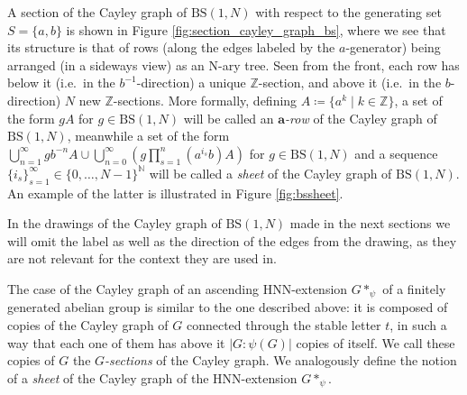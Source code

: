 \documentclass[letterpaper,11pt,reqno]{amsart}
\theoremstyle{plain}
\theoremstyle{definition}
\newcommand{\BS}[1][N]{\mathrm{BS}(1,#1)}
\begin{document}
A section of the Cayley graph of $\BS$ with respect to the generating set $S=\{a,b\}$ is shown in Figure \ref{fig:section_cayley_graph_bs}, where we see that its structure is that of rows (along the edges labeled by the $a$-generator) being arranged (in a sideways view) as an N-ary tree. Seen from the front, each row has below it (i.e.\ in the $b^{-1}$-direction) a unique $\mathbb{Z}$-section, and above it (i.e.\ in the $b$-direction) $N$ new $\mathbb{Z}$-sections. More formally, defining $A\coloneqq\{a^k \mid k\in\mathbb{Z}\}$, a set of the form $gA$ for $g\in \BS$ will be called an $\mathbf{a}$\textit{-row} of the Cayley graph of $\BS$, meanwhile a set of the form $\displaystyle\bigcup_{n=1}^{\infty}gb^{-n}A  \cup\bigcup_{n=0}^\infty\left( g\prod_{s=1}^{n}(a^{i_s}b)A \right)$ for $g\in \BS$ and a sequence $\{i_s\}_{s=1}^{\infty}\in \{0,\ldots,N-1\}^{\mathbb{N}}$ will be called a \textit{sheet} of the Cayley graph of $\BS$. An example of the latter is illustrated in Figure \ref{fig:bssheet}. 

In the drawings of the Cayley graph of $\BS$ made in the next sections we will omit the label as well as the direction of the edges from the drawing, as they are not relevant for the context they are used in.

The case of the Cayley graph of an ascending HNN-extension $G*_{\psi}$ of a finitely generated abelian group is similar to the one described above: it is composed of copies of the Cayley graph of $G$ connected through the stable letter $t$, in such a way that each one of them has above it $|G:\psi(G)|$ copies of itself. We call these copies of $G$ the $G$\textit{-sections} of the Cayley graph. We analogously define the notion of a \textit{sheet} of the Cayley graph of the HNN-extension $G*_{\psi}$.
\end{document}

